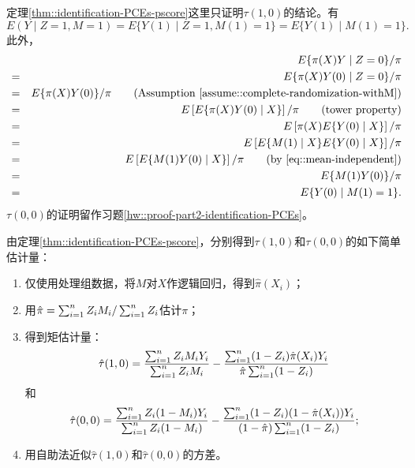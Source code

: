  \begin{myproof}{定理}{\ref{thm::identification-PCEs-pscore}}这里只证明$\tau(1,0) $的结论。有
$$
 E(Y\mid Z=1, M=1)  = E\{ Y(1) \mid Z=1, M(1) = 1 \} =  E\{ Y(1) \mid   M(1) = 1 \} .
 $$
此外，
\begin{eqnarray*}
&& E  \{\pi(X) Y\mid Z=0   \}  /\pi  \\
 &=& E  \{\pi(X) Y(0)  \mid Z=0 \}  /\pi  \\
 &=&  E  \{\pi(X) Y(0)   \}  /\pi \qquad   (\text{Assumption } \ref{assume::complete-randomization-withM}) \\
 &=&  E \left[    E\{\pi(X) Y(0) \mid X  \} \right]/\pi  \qquad (\text{tower property}) \\ 
 &=& E \left[  \pi(X)  E\{ Y(0) \mid X  \} \right]/\pi  \\ 
 &=& E \left[  E\{    M(1) \mid X\} E\{ Y(0) \mid X  \} \right]/\pi \\
 &=&  E \left[  E\{    M(1)  Y(0) \mid X  \} \right]/\pi  \qquad  (\text{by } \eqref{eq::mean-independent}) \\
 &=&  E\{    M(1) Y(0)  \}/\pi   \\
 &=&  E\{ Y(0) \mid M(1) = 1 \}  .
 \end{eqnarray*}
% 
$\tau(0,0) $的证明留作习题\ref{hw::proof-part2-identification-PCEs}。 
 \end{myproof}

 
由定理\ref{thm::identification-PCEs-pscore}，分别得到$\tau(1,0)$和$\tau(0,0) $的如下简单估计量：
\begin{enumerate}
\item
仅使用处理组数据，将$M$对$X$作逻辑回归，得到$\hat \pi(X_i)$；
\item
用$\hat \pi =  \sum_{i=1}^n Z_i M_i / \sum_{i=1}^n Z_i$估计$\pi$； 
\item
得到矩估计量：
$$
\hat \tau(1,0) =  \frac{  \sum_{i=1}^n Z_iM_iY_i  }{ \sum_{i=1}^n Z_iM_i }   -   \frac{   \sum_{i=1}^n (1-Z_i) \hat \pi(X_i) Y_i  }{ \hat \pi   \sum_{i=1}^n (1-Z_i) }   
$$
和
$$
\hat \tau(0,0) =  \frac{  \sum_{i=1}^n Z_i(1-M_i)Y_i  }{ \sum_{i=1}^n Z_i (1-M_i) }  - \frac{  \sum_{i=1}^n (1-Z_i)(1-\hat \pi(X_i)) Y_i  }{  (1- \hat \pi )\sum_{i=1}^n (1-Z_i)  }
;
$$
\item
用自助法近似$\hat \tau(1,0) $和$\hat \tau(0,0) $的方差。 
\end{enumerate}
 
